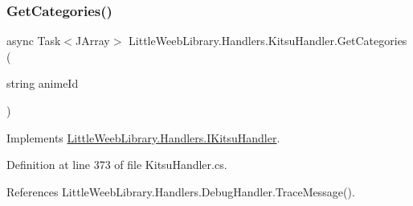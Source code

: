 \subsubsection{\texorpdfstring{Get\+Categories()}{GetCategories()}}
{\footnotesize\ttfamily async Task$<$J\+Array$>$ Little\+Weeb\+Library.\+Handlers.\+Kitsu\+Handler.\+Get\+Categories (\begin{DoxyParamCaption}\item[{string}]{anime\+Id }\end{DoxyParamCaption})}



Implements \mbox{\hyperlink{interface_little_weeb_library_1_1_handlers_1_1_i_kitsu_handler_a731b56ca79910b6b1d7b2218c34e3156}{Little\+Weeb\+Library.\+Handlers.\+I\+Kitsu\+Handler}}.



Definition at line 373 of file Kitsu\+Handler.\+cs.



References Little\+Weeb\+Library.\+Handlers.\+Debug\+Handler.\+Trace\+Message().


